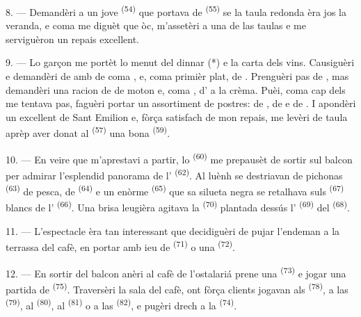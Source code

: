 8. --- Demandèri a un jove  \textsuperscript{(54)} que portava de
 \textsuperscript{(55)} se la taula redonda èra jos la
veranda, e coma me diguèt que òc, m'assetèri a una de las taulas e me serviguèron
un repais excellent.


\VUsaut{4.0mm}
\VUsaut{3.0mm}

9. --- Lo garçon me portèt lo menut del dinnar (*) e la carta dels vins.
Causiguèri e demandèri de  amb de  coma
, e, coma primièr plat, de .
Prenguèri pas de , mas demandèri una racion de  de
moton e, coma , d' a la crèma. Puèi, coma cap dels
 me tentava pas, faguèri portar un assortiment de postres:
de , de  e de . I apondèri un
excellent  de Sant Emilion e, fòrça satisfach de mon repais, me levèri
de taula aprèp aver donat al  \textsuperscript{(57)} una bona
 \textsuperscript{(59)}.

10. --- En veire que m'aprestavi a partir, lo 
\textsuperscript{(60)} me prepausèt de sortir sul balcon per admirar l'esplendid
panorama de l' \textsuperscript{(62)}. Al luènh se destriavan de
pichonas  \textsuperscript{(63)} de pesca, de 
\textsuperscript{(64)} e un enòrme  \textsuperscript{(65)}
que sa silueta negra se retalhava suls  \textsuperscript{(67)}
blancs de l' \textsuperscript{(66)}. Una brisa leugièra agitava la
 \textsuperscript{(70)} plantada dessús l'
\textsuperscript{(69)} del  \textsuperscript{(68)}.

\VUsaut{3.0mm}
\VUsaut{3.0mm}

11. --- L'espectacle èra tan interessant que decidiguèri de pujar l'endeman a la
terrassa del cafè, en portar amb ieu de  \textsuperscript{(71)} o
una  \textsuperscript{(72)}.

12. --- En sortir del balcon anèri al cafè de l'ostalariá prene una
 \textsuperscript{(73)} e jogar una partida de
 \textsuperscript{(75)}. Traversèri la sala del cafè, ont fòrça
clients jogavan als  \textsuperscript{(78)}, a las 
\textsuperscript{(79)}, al  \textsuperscript{(80)}, al
 \textsuperscript{(81)} o a las 
\textsuperscript{(82)}, e pugèri drech a la 
\textsuperscript{(74)}.

